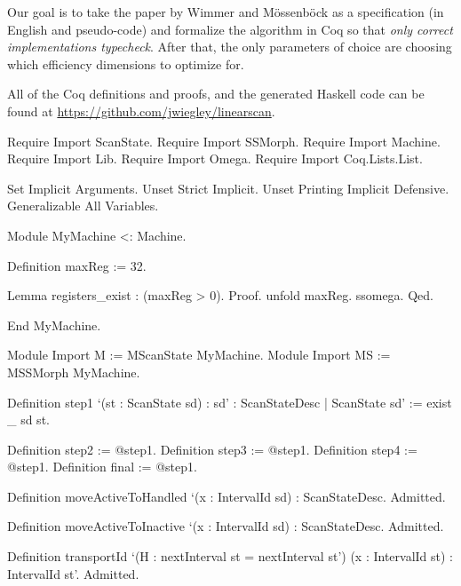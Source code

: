 \documentclass{llncs}
\newif\ifdraft\drafttrue  %
\newcommand{\xcomment}[3]{\ifdraft\textcolor{#1}{[#2: #3]}\else\fi}
\newcommand{\fixme}[1]{\xcomment{red}{FIXME}{#1}}
\begin{document}
Our goal is to take the paper by Wimmer and M\"{o}ssenb\"{o}ck as a
specification (in English and pseudo-code) and formalize the algorithm in Coq
so that \emph{only correct implementations typecheck}.  After that, the
only parameters of choice are choosing which efficiency dimensions to
optimize for.

All of the Coq definitions and proofs, and the generated Haskell code
can be found at \url{https://github.com/jwiegley/linearscan}.



\begin{MyCoqEval}
Require Import ScanState.
Require Import SSMorph.
Require Import Machine.
Require Import Lib.
Require Import Omega.
Require Import Coq.Lists.List.

Set Implicit Arguments.
Unset Strict Implicit.
Unset Printing Implicit Defensive.
Generalizable All Variables.

Module MyMachine <: Machine.

Definition maxReg := 32.

Lemma registers_exist : (maxReg > 0).
Proof. unfold maxReg. ssomega. Qed.

End MyMachine.

Module Import M := MScanState MyMachine.
Module Import MS := MSSMorph MyMachine.

Definition step1 `(st : ScanState sd)
  : { sd' : ScanStateDesc | ScanState sd' } :=
  exist _ sd st.

Definition step2 := @step1.
Definition step3 := @step1.
Definition step4 := @step1.
Definition final := @step1.

Definition moveActiveToHandled `(x : IntervalId sd) : ScanStateDesc.
Admitted.

Definition moveActiveToInactive `(x : IntervalId sd) : ScanStateDesc.
Admitted.

Definition transportId `(H : nextInterval st = nextInterval st')
  (x : IntervalId st) : IntervalId st'.
Admitted.
\end{MyCoqEval}
\end{document}
